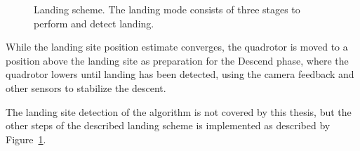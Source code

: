         \begin{figure}[H]
            \noindent{}
            \caption{Landing scheme. The landing mode consists of three stages to perform and detect landing.}
            \label{fig:logic:landingscheme}
        \end{figure}

        While the landing site position estimate converges, the quadrotor is moved to
        a position above the landing site as preparation for the Descend phase,
        where the quadrotor lowers until landing has been detected,
        using the camera feedback and other sensors to stabilize the descent.

        The landing site detection of the algorithm is not covered by
        this thesis, but the other steps of the described landing scheme
        is implemented as described by Figure~\ref{fig:logic:landingscheme}.

